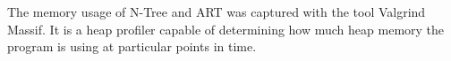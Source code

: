 The memory usage of N-Tree and ART was captured with the tool Valgrind Massif. It is a heap profiler capable of determining how much heap memory the program is using at particular points in time. 


%
%


